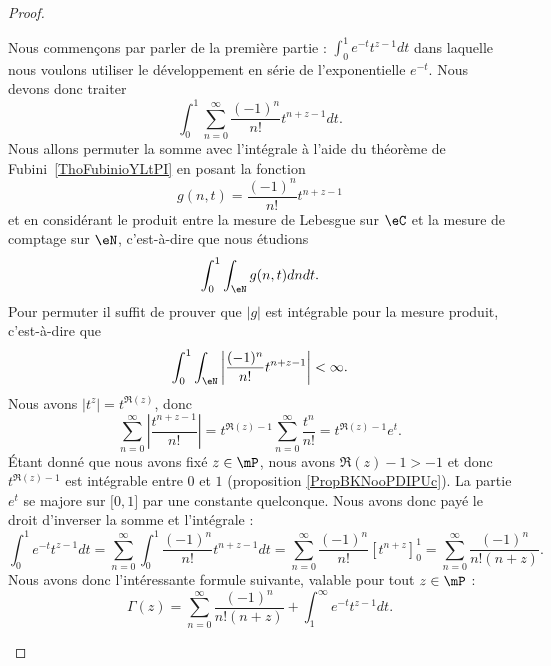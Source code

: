 \begin{proof}
\begin{subproof}
		 Nous commençons par parler de la première partie : \( \int_0^1 e^{-t}t^{z-1}dt\) dans laquelle nous voulons utiliser le développement en série de l'exponentielle \(  e^{-t}\). Nous devons donc traiter
		\begin{equation}
			\int_0^1\sum_{n=0}^{\infty}\frac{ (-1)^n }{ n! }t^{n+z-1}dt.
		\end{equation}
		Nous allons permuter la somme avec l'intégrale à l'aide du théorème de Fubini~\ref{ThoFubinioYLtPI} en posant la fonction
		\begin{equation}
			g(n,t)=\frac{ (-1)^n }{ n! }t^{n+z-1}
		\end{equation}
		et en considérant le produit entre la mesure de Lebesgue sur \( \eC\) et la mesure de comptage sur \( \eN\), c'est-à-dire que nous étudions
		\begin{equation}
			\int_0^1\int_{\eN}g(n,t)dndt.
		\end{equation}
		Pour permuter il suffit de prouver que \( | g |\) est intégrable pour la mesure produit, c'est-à-dire que
		\begin{equation}
			\int_0^1\int_{\eN}\left| \frac{ (-1)^n }{ n! }t^{n+z-1} \right| <\infty.
		\end{equation}
		Nous avons \( | t^z|=t^{\Re(z)}\), donc
		\begin{equation}
			\sum_{n=0}^{\infty}\left| \frac{ t^{n+z-1} }{ n! } \right| =t^{\Re(z)-1}\sum_{n=0}^{\infty}\frac{ t^n }{ n! }=t^{\Re(z)-1} e^{t}.
		\end{equation}
		Étant donné que nous avons fixé \( z\in\mP\), nous avons \( \Re(z)-1>-1\) et donc \( t^{\Re(z)-1}\) est intégrable entre \( 0\) et \( 1\) (proposition \ref{PropBKNooPDIPUc}).
		La partie \(  e^{t}\) se majore sur \( \mathopen[ 0 , 1 \mathclose]\) par une constante quelconque. Nous avons donc payé le droit d'inverser la somme et l'intégrale :
		\begin{equation}
			\int_0^1 e^{-t}t^{z-1}dt=\sum_{n=0}^{\infty}\int_0^1\frac{ (-1)^n }{ n! }t^{n+z-1}dt=\sum_{n=0}^{\infty}\frac{ (-1)^n }{ n! }[t^{n+z}]_0^1=\sum_{n=0}^{\infty}\frac{ (-1)^n }{ n!(n+z) }.
		\end{equation}
		Nous avons donc l'intéressante formule suivante, valable pour tout \( z\in\mP\) :
		\begin{equation}
			\Gamma(z)=\sum_{n=0}^{\infty}\frac{ (-1)^n }{ n!(n+z) }+\int_1^{\infty} e^{-t}t^{z-1}dt.
		\end{equation}


\end{subproof}
\end{proof}

